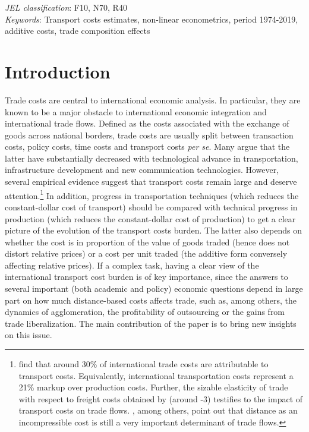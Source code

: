 \documentclass[a4paper,11pt]{article}
\begin{document}
\thispagestyle{empty} \pagestyle{plain} \setcounter{page}{1}

\bigskip


\noindent \emph{JEL classification}: F10, N70, R40 \\
\noindent \emph{Keywords}: Transport costs estimates, non-linear econometrics, period 1974-2019, additive costs, trade composition effects

{\normalsize \vspace{0cm} }

{\normalsize \titlepage }

{\normalsize \newpage }


\section{Introduction \label{sec:Intro}}


Trade costs are central to international economic analysis. In particular, they are known to be a major obstacle to international economic integration and international trade flows. Defined as the costs associated with the exchange of goods across
national borders, trade costs are usually split between transaction costs, policy costs, time costs and transport costs \textit{per se}. Many argue that the latter have substantially decreased with technological advance in transportation, infrastructure development
and new communication technologies. However, several empirical evidence
suggest that transport costs remain large and deserve attention.\footnote{\cite{anderson_wincoop_jel} find that around 30\% of international trade costs are attributable to transport costs. Equivalently, international transportation costs represent a 21\% markup over production costs. Further, the sizable elasticity of trade with respect to freight costs obtained by \cite{Behar_Venables} (around -3) testifies to the impact of transport costs on trade flows. \cite{Disdier_Head08}, among others, point out that distance as an incompressible cost is still a very important determinant of trade flows.} In addition, progress in transportation techniques (which reduces the constant-dollar cost of transport) should be compared with technical progress in production (which reduces the constant-dollar cost of production) to get a clear picture of the evolution
of the transport costs burden. The latter also depends on whether the cost is in proportion of the value of goods traded (hence does not distort relative prices) or a cost per unit traded (the additive form conversely affecting relative prices). If a complex task, having a clear view of the international transport cost burden is of key importance, since the answers to several important (both academic and policy) economic questions depend in large part on how much distance-based costs affects trade, such as, among others, the dynamics
of agglomeration, the profitability of outsourcing or the gains from trade liberalization. The main contribution of the paper is to bring new insights on this issue.\smallskip
\end{document}
